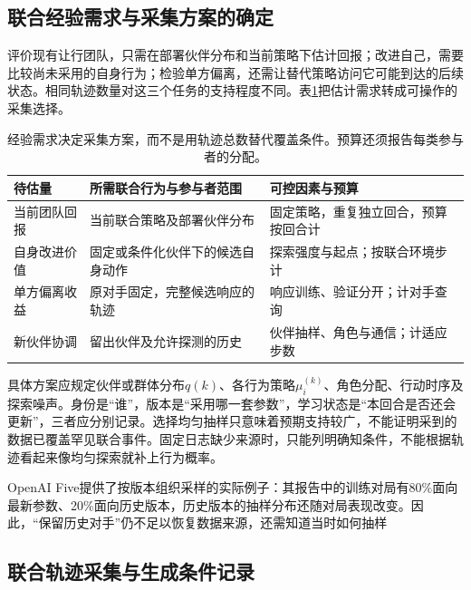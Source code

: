 \subsection{联合经验需求与采集方案的确定}
\label{sec:rl-multi-agent-collection-plan}

评价现有让行团队，只需在部署伙伴分布和当前策略下估计回报；改进自己，需要比较尚未采用的自身行为；检验单方偏离，还需让替代策略访问它可能到达的后续状态。相同轨迹数量对这三个任务的支持程度不同。表\ref{tab:rl-multi-agent-data-needs}把估计需求转成可操作的采集选择。

\begin{table}[htbp]
 \centering
 \begin{tabularx}{\linewidth}{@{}l >{\raggedright\arraybackslash}X >{\raggedright\arraybackslash}X@{}}
 \toprule
 待估量 & 所需联合行为与参与者范围 & 可控因素与预算\\
 \midrule
 当前团队回报 & 当前联合策略及部署伙伴分布 & 固定策略，重复独立回合，预算按回合计\\
 自身改进价值 & 固定或条件化伙伴下的候选自身动作 & 探索强度与起点；按联合环境步计\\
 单方偏离收益 & 原对手固定，完整候选响应的轨迹 & 响应训练、验证分开；计对手查询\\
 新伙伴协调 & 留出伙伴及允许探测的历史 & 伙伴抽样、角色与通信；计适应步数\\
 \bottomrule
 \end{tabularx}
 \caption{经验需求决定采集方案，而不是用轨迹总数替代覆盖条件。预算还须报告每类参与者的分配。}
 \label{tab:rl-multi-agent-data-needs}
\end{table}

具体方案应规定伙伴或群体分布$q(k)$、各行为策略$\mu_i^{(k)}$、角色分配、行动时序及探索噪声。身份是“谁”，版本是“采用哪一套参数”，学习状态是“本回合是否还会更新”，三者应分别记录。选择均匀抽样只意味着预期支持较广，不能证明采到的数据已覆盖罕见联合事件。固定日志缺少来源时，只能列明确知条件，不能根据轨迹看起来像均匀探索就补上行为概率。

OpenAI Five提供了按版本组织采样的实际例子：其报告中的训练对局有80\%面向最新参数、20\%面向历史版本，历史版本的抽样分布还随对局表现改变。因此，“保留历史对手”仍不足以恢复数据来源，还需知道当时如何抽样

\subsection{联合轨迹采集与生成条件记录}
\label{sec:rl-multi-agent-records}

